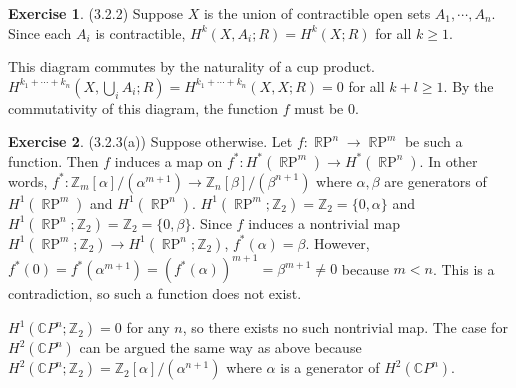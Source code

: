 \documentclass[12pt, psamsfonts]{amsart}
\theoremstyle{definition}
\newtheorem*{exer}{Exercise}
\theoremstyle{remark}
\DeclareMathOperator{\RP}{\mathbb{R}P}
\numberwithin{equation}{section}
\begin{document}
\begin{exer}{(3.2.2)}
  Suppose $X$ is the union of contractible open sets $A_1, \cdots, A_n$.
  Since each $A_i$ is contractible, $H^k(X, A_i; R) = H^k(X; R)$ for all $k \geq 1$.

  \begin{center}
  \end{center}

  This diagram commutes by the naturality of a cup product.
  $H^{k_1 + \cdots + k_n}(X, \bigcup_i A_i; R) = H^{k_1 + \cdots + k_n}(X, X; R) = 0$ for all $k + l \ge 1$.
  By the commutativity of this diagram, the function $f$ must be 0.
\end{exer}

\begin{exer}{(3.2.3(a))}
  Suppose otherwise.
  Let $f: \RP^n \rightarrow \RP^m$ be such a function.
  Then $f$ induces a map on $f^{\ast}: H^{\ast}(\RP^m) \rightarrow H^{\ast}(\RP^n)$.
  In other words, $f^{\ast}: \mathbb{Z}_m[\alpha]/(\alpha^{m + 1}) \rightarrow \mathbb{Z}_n[\beta]/(\beta^{n + 1})$ where $\alpha, \beta$ are generators of $H^1(\RP^m)$ and $H^1(\RP^n)$.
  $H^1(\RP^m; \mathbb{Z}_2) = \mathbb{Z}_2 = \{ 0, \alpha \}$ and $H^1(\RP^n; \mathbb{Z}_2) = \mathbb{Z}_2 = \{ 0, \beta \}$.
  Since $f$ induces a nontrivial map $H^1(\RP^m; \mathbb{Z}_2) \rightarrow H^1(\RP^n; \mathbb{Z}_2)$, $f^{\ast}(\alpha) = \beta$.
  However, $f^{\ast}(0) = f^{\ast}(\alpha^{m + 1}) = (f^{\ast}(\alpha))^{m + 1} = \beta^{m + 1} \ne 0$ because $m < n$.
  This is a contradiction, so such a function does not exist.

  $H^1(\mathbb{C}P^n; \mathbb{Z}_2) = 0$ for any $n$, so there exists no such nontrivial map.
  The case for $H^2(\mathbb{C}P^n)$ can be argued the same way as above because $H^2(\mathbb{C}P^n;\mathbb{Z}_2) = \mathbb{Z}_2[\alpha]/(\alpha^{n + 1})$ where $\alpha$ is a generator of $H^2(\mathbb{C}P^n)$.
\end{exer}
\end{document}
